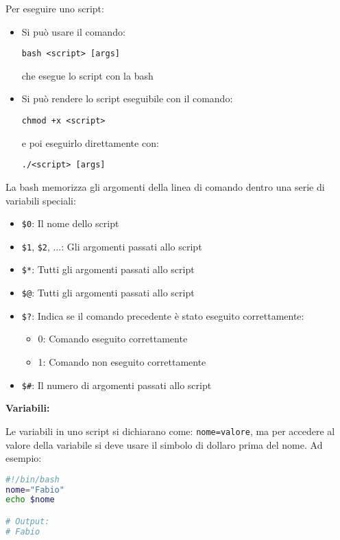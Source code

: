 \documentclass[a4paper]{article}
\begin{document}
\vspace{1em}
\noindent
Per eseguire uno script:
\begin{itemize}
  \item Si può usare il comando:
\begin{lstlisting}
bash <script> [args]
\end{lstlisting}
        che esegue lo script con la bash
  \item Si può rendere lo script eseguibile con il comando:
\begin{lstlisting}
chmod +x <script>
\end{lstlisting}
        e poi eseguirlo direttamente con:
\begin{lstlisting}
./<script> [args]
\end{lstlisting}
\end{itemize}

\vspace{1em}
\noindent
La bash memorizza gli argomenti della linea di comando dentro una serie di variabili
speciali:
\begin{itemize}
  \item \texttt{\$0}: Il nome dello script
  \item \texttt{\$1}, \texttt{\$2}, ...: Gli argomenti passati allo script
  \item \texttt{\$*}: Tutti gli argomenti passati allo script
  \item \texttt{\$@}: Tutti gli argomenti passati allo script
  \item \texttt{\$?}: Indica se il comando precedente è stato eseguito correttamente:
    \begin{itemize}
      \item 0: Comando eseguito correttamente
      \item 1: Comando non eseguito correttamente
    \end{itemize}
  \item \texttt{\$\#}: Il numero di argomenti passati allo script
\end{itemize}

\vspace{1em}
\noindent
\textbf{Variabili:}

\noindent
Le variabili in uno script si dichiarano come: \texttt{nome=valore}, ma per accedere
al valore della variabile si deve usare il simbolo di dollaro prima del nome. Ad esempio:
\begin{lstlisting}[language=bash]
#!/bin/bash
nome="Fabio"
echo $nome

# Output:
# Fabio
\end{lstlisting}
\end{document}

